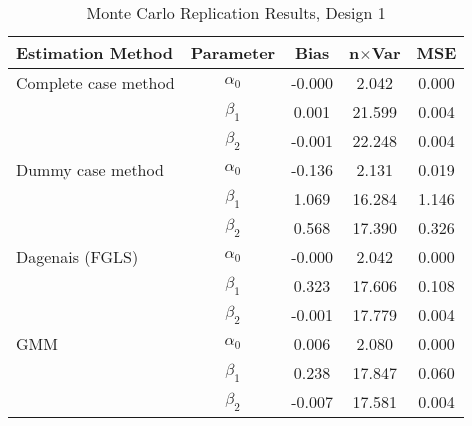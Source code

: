 \begin{table}
\centering
\caption{Monte Carlo Replication Results, Design 1}
\label{table:MCReplicationResultsDesign1}
\begin{tabular}{lcccc}
\toprule
Estimation Method & Parameter & Bias & n$\times$Var & MSE \\
\midrule
Complete case method & $\alpha_0$ & -0.000 & 2.042 & 0.000 \\
 & $\beta_1$ & 0.001 & 21.599 & 0.004 \\
 & $\beta_2$ & -0.001 & 22.248 & 0.004 \\
Dummy case method & $\alpha_0$ & -0.136 & 2.131 & 0.019 \\
 & $\beta_1$ & 1.069 & 16.284 & 1.146 \\
 & $\beta_2$ & 0.568 & 17.390 & 0.326 \\
Dagenais (FGLS) & $\alpha_0$ & -0.000 & 2.042 & 0.000 \\
 & $\beta_1$ & 0.323 & 17.606 & 0.108 \\
 & $\beta_2$ & -0.001 & 17.779 & 0.004 \\
GMM & $\alpha_0$ & 0.006 & 2.080 & 0.000 \\
 & $\beta_1$ & 0.238 & 17.847 & 0.060 \\
 & $\beta_2$ & -0.007 & 17.581 & 0.004 \\
\bottomrule
\end{tabular}
\end{table}
